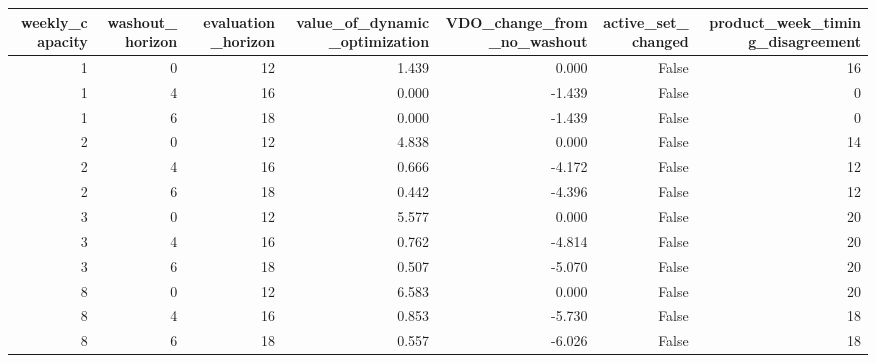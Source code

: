 \begin{tabular}{rrrrrrr}
\toprule
weekly_capacity & washout_horizon & evaluation_horizon & value_of_dynamic_optimization & VDO_change_from_no_washout & active_set_changed & product_week_timing_disagreement \\
\midrule
1 & 0 & 12 & 1.439 & 0.000 & False & 16 \\
1 & 4 & 16 & 0.000 & -1.439 & False & 0 \\
1 & 6 & 18 & 0.000 & -1.439 & False & 0 \\
2 & 0 & 12 & 4.838 & 0.000 & False & 14 \\
2 & 4 & 16 & 0.666 & -4.172 & False & 12 \\
2 & 6 & 18 & 0.442 & -4.396 & False & 12 \\
3 & 0 & 12 & 5.577 & 0.000 & False & 20 \\
3 & 4 & 16 & 0.762 & -4.814 & False & 20 \\
3 & 6 & 18 & 0.507 & -5.070 & False & 20 \\
8 & 0 & 12 & 6.583 & 0.000 & False & 20 \\
8 & 4 & 16 & 0.853 & -5.730 & False & 18 \\
8 & 6 & 18 & 0.557 & -6.026 & False & 18 \\
\bottomrule
\end{tabular}
